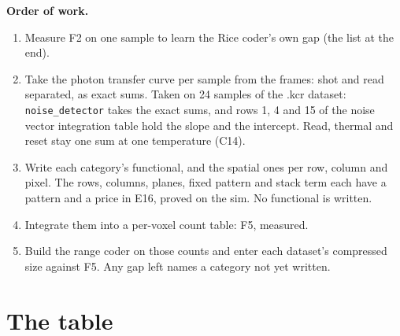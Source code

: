 \textbf{Order of work.}

\begin{enumerate}
\item Measure F2 on one sample to learn the Rice coder's own gap (the list at the end).
\item Take the photon transfer curve per sample from the frames: shot and read separated, as exact sums. Taken on 24 samples of the .kcr dataset: \texttt{noise\_\allowbreak{}detector} takes the exact sums, and rows 1, 4 and 15 of the noise vector integration table hold the slope and the intercept. Read, thermal and reset stay one sum at one temperature (C14).
\item Write each category's functional, and the spatial ones per row, column and pixel. The rows, columns, planes, fixed pattern and stack term each have a pattern and a price in E16, proved on the sim. No functional is written.
\item Integrate them into a per-voxel count table: F5, measured.
\item Build the range coder on those counts and enter each dataset's compressed size against F5. Any gap left names a category not yet written.
\end{enumerate}

\section{\texorpdfstring{The table}{The table}}

